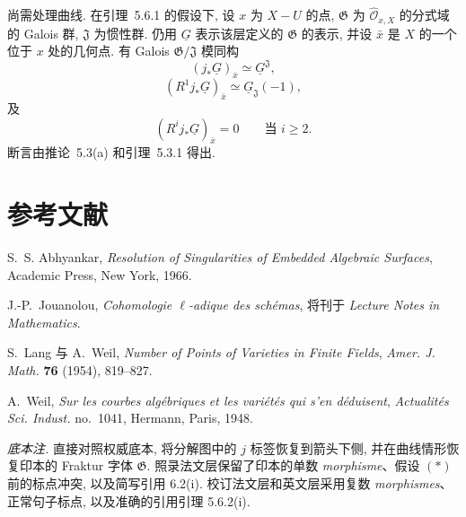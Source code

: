 尚需处理曲线. 在引理~5.6.1 的假设下, 设 $x$ 为 $X-U$ 的点,
$\mathfrak G$ 为 $\widehat{\mathcal O}_{x,X}$ 的分式域的 Galois 群,
$\mathfrak J$ 为惯性群. 仍用 $\underline G$ 表示该层定义的 $\mathfrak G$ 的表示,
并设 $\bar x$ 是 $X$ 的一个位于 $x$ 处的几何点. 有 Galois $\mathfrak G/\mathfrak J$ 模同构
\[
(j_*\underline G)_{\bar x}\simeq\underline G^{\mathfrak J},
\]
\[
(R^1j_*\underline G)_{\bar x}\simeq\underline G_{\mathfrak J}(-1),
\]
及
\[
(R^ij_*\underline G)_{\bar x}=0\qquad\text{当 }i\geq2.
\]
断言由推论~5.3(a) 和引理~5.3.1 得出.

\section*{参考文献}
\begin{enumerate}[label={\textup{[\arabic*]}},leftmargin=2.4em]
\item S.~S. Abhyankar, \emph{Resolution of Singularities of Embedded Algebraic Surfaces}, Academic Press, New York, 1966.
\item J.-P.~Jouanolou, \emph{Cohomologie $\ell$-adique des schémas}, 将刊于 \emph{Lecture Notes in Mathematics}.
\item S.~Lang 与 A.~Weil, \emph{Number of Points of Varieties in Finite Fields}, \emph{Amer. J. Math.} \textbf{76} (1954), 819--827.
\item A.~Weil, \emph{Sur les courbes algébriques et les variétés qui s'en déduisent}, \emph{Actualités Sci. Indust.} no.~1041, Hermann, Paris, 1948.
\end{enumerate}

\medskip
\noindent\emph{底本注.}
直接对照权威底本, 将分解图中的 $j$ 标签恢复到箭头下侧,
并在曲线情形恢复印本的 Fraktur 字体 $\mathfrak G$.
照录法文层保留了印本的单数 \emph{morphisme}、假设 $(*)$ 前的标点冲突,
以及简写引用 6.2(i). 校订法文层和英文层采用复数 \emph{morphismes}、正常句子标点,
以及准确的引用引理 5.6.2(i).
